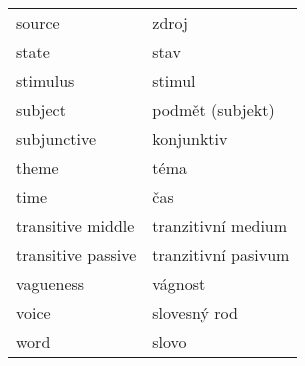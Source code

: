 \documentclass[a4paper,landscape,headrule,footrule,xetex]{foils}
\begin{document}
\begin{longtable}{ll}
 source & zdroj \\
 state & stav \\
 stimulus & stimul \\
 subject & podmět (subjekt) \\
 subjunctive & konjunktiv \\
 theme & téma \\
 time & čas \\
 transitive middle & tranzitivní medium \\
 transitive passive & tranzitivní pasivum \\
 vagueness & vágnost \\
 voice & slovesný rod \\
 word & slovo \\
 \end{longtable}
\end{document}
